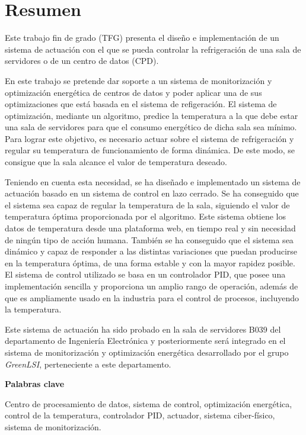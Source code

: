 \cleardoublepage
\chapter*{Resumen} %
\markboth{}{} %

	Este trabajo fin de grado (TFG) presenta el diseño e implementación de un sistema de actuación con el que se pueda controlar la refrigeración de una sala de servidores o de un centro de datos (CPD).

	En este trabajo se pretende dar soporte a un sistema de monitorización y optimización energética de centros de datos y poder aplicar una de sus optimizaciones que está basada en el sistema de refigeración. El sistema de optimización, mediante un algoritmo, predice la temperatura a la que debe estar una sala de servidores para que el consumo energético de dicha sala sea mínimo. Para lograr este objetivo, es necesario actuar sobre el sistema de refrigeración y regular su temperatura de funcionamiento de forma dinámica. De este modo, se consigue que la sala alcance el valor de temperatura deseado.

	Teniendo en cuenta esta necesidad, se ha diseñado e implementado un sistema de actuación basado en un sistema de control en lazo cerrado. Se ha conseguido que el sistema sea capaz de regular la temperatura de la sala, siguiendo el valor de temperatura óptima proporcionada por el algoritmo. Este sistema obtiene los datos de temperatura desde una plataforma web, en tiempo real y sin necesidad de ningún tipo de acción humana. También se ha conseguido que el sistema sea dinámico y capaz de responder a las distintas variaciones que puedan producirse en la temperatura óptima, de una forma estable y con la mayor rapidez posible. El sistema de control utilizado se basa en un controlador PID, que posee una implementación sencilla y proporciona un amplio rango de operación, además de que es ampliamente usado en la industria para el control de procesos, incluyendo la temperatura.

	Este sistema de actuación ha sido probado en la sala de servidores B039 del departamento de Ingeniería Electrónica y posteriormente será integrado en el sistema de monitorización y optimización energética desarrollado por el grupo \textit{GreenLSI}, perteneciente a este departamento.

\noindent\textbf{Palabras clave} 

\noindent Centro de procesamiento de datos, sistema de control, optimización energética, control de la temperatura, controlador PID, actuador, sistema ciber-físico, sistema de monitorización.

